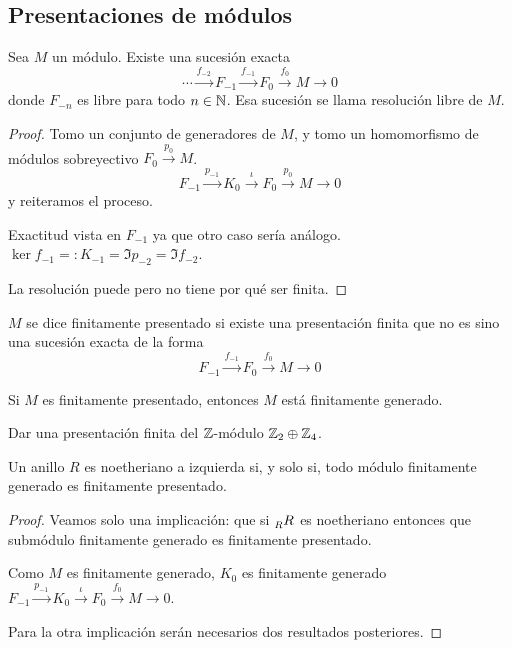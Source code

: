 \subsection{Presentaciones de módulos}

\begin{prop}
  Sea \(M\) un módulo. Existe una sucesión exacta
  \[
    \cdots\overset{f_{-2}}{\longrightarrow} F_{-1}
    \overset{f_{-1}}{\longrightarrow} F_{0}
    \overset{f_{0}}{\longrightarrow} M
    \overset{}{\longrightarrow} 0
  \]
  donde \(F_{-n}\) es libre para todo \(n\in\mathbb{N}\).
  Esa sucesión se llama resolución libre de \(M\).
\end{prop}
\begin{proof}
  Tomo un conjunto de generadores de \(M\), y tomo un homomorfismo de módulos
  sobreyectivo \(F_0\overset{p_0}{\longrightarrow} M\).
  \[
    F_{-1}
    \overset{p_{-1}}{\longrightarrow} K_0
    \overset{\iota}{\longrightarrow} F_0
    \overset{p_{0}}{\longrightarrow} M
    \overset{}{\longrightarrow} 0
  \]
  y reiteramos el proceso.

  Exactitud vista en \(F_{-1}\) ya que otro caso sería análogo.
  \(\ker f_{-1}=:K_{-1}=\Im p_{-2}=\Im  f_{-2}\).

  La resolución puede pero no tiene por qué ser finita.

\end{proof}

\begin{df}
  \(M\) se dice finitamente presentado si existe una presentación finita que no
  es sino una sucesión exacta de la forma
  \[
    F_{-1}\overset{f_{-1}}{\longrightarrow} F_0
    \overset{f_{0}}{\longrightarrow}M \longrightarrow 0
  \]
\end{df}

\begin{obs}
  Si \(M\) es finitamente presentado, entonces \(M\) está finitamente
  generado.
\end{obs}

\begin{ejercicio}
  Dar una presentación finita del \(\mathbb{Z}\)-módulo \(\mathbb{Z}_2\oplus\mathbb{Z}_4\).
\end{ejercicio}

\begin{prop}
  Un anillo \(R\) es noetheriano a izquierda si, y solo si, todo módulo
  finitamente generado es finitamente presentado.
\end{prop}
\begin{proof}
  Veamos solo una implicación: que si \(\prescript{}{R}{R}\) es
  noetheriano entonces que submódulo finitamente generado es finitamente
  presentado.

  Como \(M\) es finitamente generado, \(K_0\) es finitamente
  generado \(F_{-1}\overset{p_{-1}}{\longrightarrow}
  K_0\overset{\iota}{\longrightarrow}
  F_0\overset{f_0}{\longrightarrow} M\longrightarrow 0\).

  Para la otra implicación serán necesarios dos resultados posteriores.
\end{proof}

